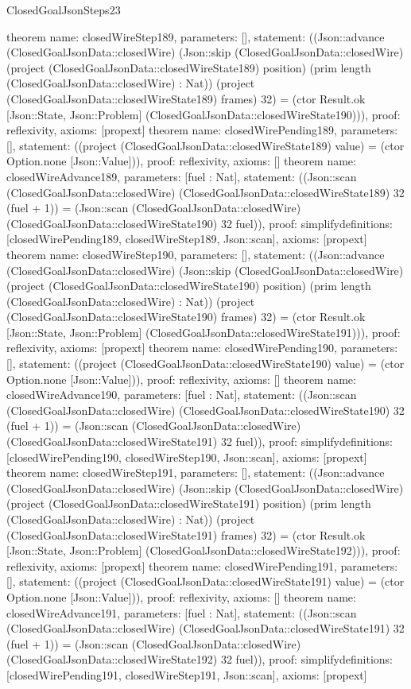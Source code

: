 \begin{lexlean}{ClosedGoalJsonSteps23}
\begin{semanticmodule}
{}
theorem{
 name: closedWireStep189, parameters: [],
 statement: ((Json::advance (ClosedGoalJsonData::closedWire) (Json::skip (ClosedGoalJsonData::closedWire) (project (ClosedGoalJsonData::closedWireState189) position) (prim length (ClosedGoalJsonData::closedWire) : Nat)) (project (ClosedGoalJsonData::closedWireState189) frames) 32) = (ctor Result.ok [Json::State, Json::Problem] (ClosedGoalJsonData::closedWireState190))), proof: reflexivity{}, axioms: [propext]
}
theorem{
 name: closedWirePending189, parameters: [],
 statement: ((project (ClosedGoalJsonData::closedWireState189) value) = (ctor Option.none [Json::Value])), proof: reflexivity{}, axioms: []
}
theorem{
 name: closedWireAdvance189, parameters: [fuel : Nat],
 statement: ((Json::scan (ClosedGoalJsonData::closedWire) (ClosedGoalJsonData::closedWireState189) 32 (fuel + 1)) = (Json::scan (ClosedGoalJsonData::closedWire) (ClosedGoalJsonData::closedWireState190) 32 fuel)), proof: simplify{definitions: [closedWirePending189, closedWireStep189, Json::scan]}, axioms: [propext]
}
theorem{
 name: closedWireStep190, parameters: [],
 statement: ((Json::advance (ClosedGoalJsonData::closedWire) (Json::skip (ClosedGoalJsonData::closedWire) (project (ClosedGoalJsonData::closedWireState190) position) (prim length (ClosedGoalJsonData::closedWire) : Nat)) (project (ClosedGoalJsonData::closedWireState190) frames) 32) = (ctor Result.ok [Json::State, Json::Problem] (ClosedGoalJsonData::closedWireState191))), proof: reflexivity{}, axioms: [propext]
}
theorem{
 name: closedWirePending190, parameters: [],
 statement: ((project (ClosedGoalJsonData::closedWireState190) value) = (ctor Option.none [Json::Value])), proof: reflexivity{}, axioms: []
}
theorem{
 name: closedWireAdvance190, parameters: [fuel : Nat],
 statement: ((Json::scan (ClosedGoalJsonData::closedWire) (ClosedGoalJsonData::closedWireState190) 32 (fuel + 1)) = (Json::scan (ClosedGoalJsonData::closedWire) (ClosedGoalJsonData::closedWireState191) 32 fuel)), proof: simplify{definitions: [closedWirePending190, closedWireStep190, Json::scan]}, axioms: [propext]
}
theorem{
 name: closedWireStep191, parameters: [],
 statement: ((Json::advance (ClosedGoalJsonData::closedWire) (Json::skip (ClosedGoalJsonData::closedWire) (project (ClosedGoalJsonData::closedWireState191) position) (prim length (ClosedGoalJsonData::closedWire) : Nat)) (project (ClosedGoalJsonData::closedWireState191) frames) 32) = (ctor Result.ok [Json::State, Json::Problem] (ClosedGoalJsonData::closedWireState192))), proof: reflexivity{}, axioms: [propext]
}
theorem{
 name: closedWirePending191, parameters: [],
 statement: ((project (ClosedGoalJsonData::closedWireState191) value) = (ctor Option.none [Json::Value])), proof: reflexivity{}, axioms: []
}
theorem{
 name: closedWireAdvance191, parameters: [fuel : Nat],
 statement: ((Json::scan (ClosedGoalJsonData::closedWire) (ClosedGoalJsonData::closedWireState191) 32 (fuel + 1)) = (Json::scan (ClosedGoalJsonData::closedWire) (ClosedGoalJsonData::closedWireState192) 32 fuel)), proof: simplify{definitions: [closedWirePending191, closedWireStep191, Json::scan]}, axioms: [propext]
}
\end{semanticmodule}
\end{lexlean}
